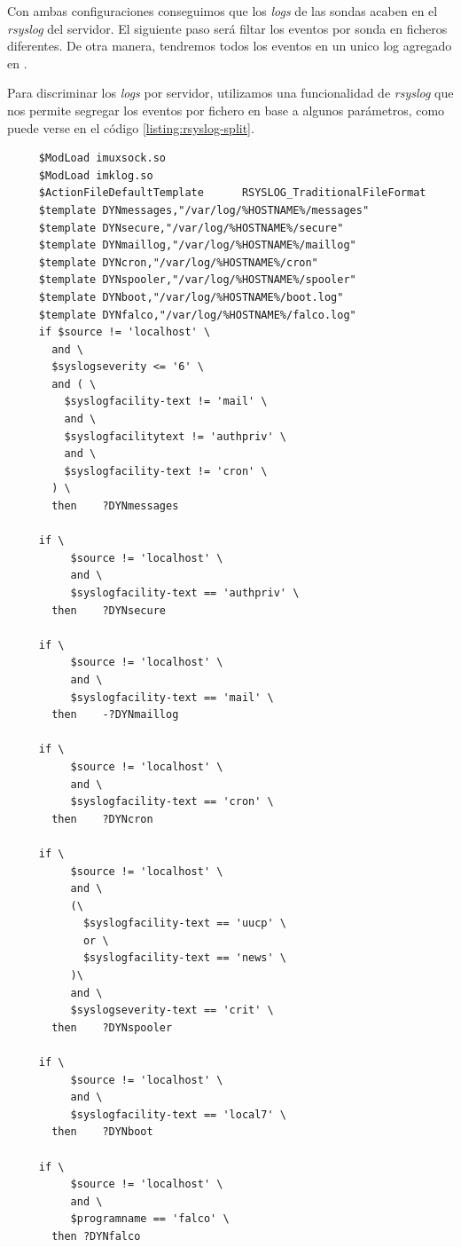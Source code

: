 Con ambas configuraciones conseguimos que los \emph{logs} de las sondas acaben en el \emph{rsyslog} del servidor.
El siguiente paso será filtar los eventos por sonda en ficheros diferentes. De otra manera, tendremos todos los eventos
en un unico log agregado en .

Para discriminar los \emph{logs} por servidor, utilizamos una funcionalidad de \emph{rsyslog} que nos permite
segregar los eventos por fichero en base a algunos parámetros, como puede verse en el código \ref{listing:rsyslog-split}.

\begin{verbatim}
     $ModLoad imuxsock.so
     $ModLoad imklog.so
     $ActionFileDefaultTemplate      RSYSLOG_TraditionalFileFormat
     $template DYNmessages,"/var/log/%HOSTNAME%/messages"
     $template DYNsecure,"/var/log/%HOSTNAME%/secure"
     $template DYNmaillog,"/var/log/%HOSTNAME%/maillog"
     $template DYNcron,"/var/log/%HOSTNAME%/cron"
     $template DYNspooler,"/var/log/%HOSTNAME%/spooler"
     $template DYNboot,"/var/log/%HOSTNAME%/boot.log"
     $template DYNfalco,"/var/log/%HOSTNAME%/falco.log"
     if $source != 'localhost' \
       and \
       $syslogseverity <= '6' \
       and ( \
         $syslogfacility-text != 'mail' \
         and \
         $syslogfacilitytext != 'authpriv' \
         and \
         $syslogfacility-text != 'cron' \
       ) \
       then    ?DYNmessages

     if \
          $source != 'localhost' \
          and \
          $syslogfacility-text == 'authpriv' \
       then    ?DYNsecure

     if \
          $source != 'localhost' \
          and \
          $syslogfacility-text == 'mail' \
       then    -?DYNmaillog

     if \
          $source != 'localhost' \
          and \
          $syslogfacility-text == 'cron' \
       then    ?DYNcron

     if \
          $source != 'localhost' \
          and \
          (\
            $syslogfacility-text == 'uucp' \
            or \
            $syslogfacility-text == 'news' \
          )\
          and \
          $syslogseverity-text == 'crit' \
       then    ?DYNspooler

     if \
          $source != 'localhost' \
          and \
          $syslogfacility-text == 'local7' \
       then    ?DYNboot

     if \
          $source != 'localhost' \
          and \
          $programname == 'falco' \
       then ?DYNfalco
\end{verbatim}
\bigskip


